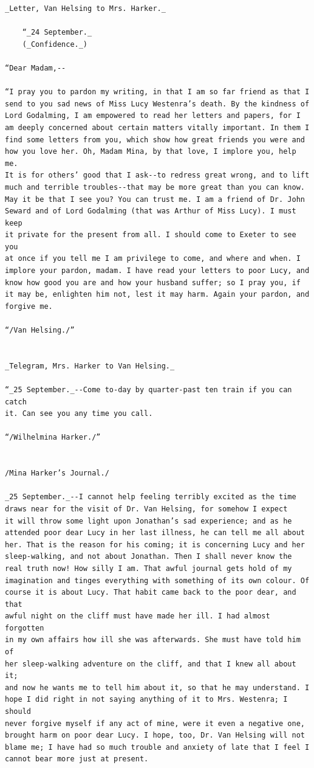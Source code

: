 \documentclass{article}
\begin{document}
\begin{verbatim}
_Letter, Van Helsing to Mrs. Harker._

    “_24 September._
    (_Confidence._)

“Dear Madam,--

“I pray you to pardon my writing, in that I am so far friend as that I
send to you sad news of Miss Lucy Westenra’s death. By the kindness of
Lord Godalming, I am empowered to read her letters and papers, for I
am deeply concerned about certain matters vitally important. In them I
find some letters from you, which show how great friends you were and
how you love her. Oh, Madam Mina, by that love, I implore you, help me.
It is for others’ good that I ask--to redress great wrong, and to lift
much and terrible troubles--that may be more great than you can know.
May it be that I see you? You can trust me. I am a friend of Dr. John
Seward and of Lord Godalming (that was Arthur of Miss Lucy). I must keep
it private for the present from all. I should come to Exeter to see you
at once if you tell me I am privilege to come, and where and when. I
implore your pardon, madam. I have read your letters to poor Lucy, and
know how good you are and how your husband suffer; so I pray you, if
it may be, enlighten him not, lest it may harm. Again your pardon, and
forgive me.

“/Van Helsing./”


_Telegram, Mrs. Harker to Van Helsing._

“_25 September._--Come to-day by quarter-past ten train if you can catch
it. Can see you any time you call.

“/Wilhelmina Harker./”


/Mina Harker’s Journal./

_25 September._--I cannot help feeling terribly excited as the time
draws near for the visit of Dr. Van Helsing, for somehow I expect
it will throw some light upon Jonathan’s sad experience; and as he
attended poor dear Lucy in her last illness, he can tell me all about
her. That is the reason for his coming; it is concerning Lucy and her
sleep-walking, and not about Jonathan. Then I shall never know the
real truth now! How silly I am. That awful journal gets hold of my
imagination and tinges everything with something of its own colour. Of
course it is about Lucy. That habit came back to the poor dear, and that
awful night on the cliff must have made her ill. I had almost forgotten
in my own affairs how ill she was afterwards. She must have told him of
her sleep-walking adventure on the cliff, and that I knew all about it;
and now he wants me to tell him about it, so that he may understand. I
hope I did right in not saying anything of it to Mrs. Westenra; I should
never forgive myself if any act of mine, were it even a negative one,
brought harm on poor dear Lucy. I hope, too, Dr. Van Helsing will not
blame me; I have had so much trouble and anxiety of late that I feel I
cannot bear more just at present.


\end{verbatim}
\end{document}
